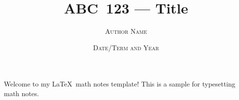 \documentclass[twoside]{article}
\begin{document}
\title{\Huge \bfseries ABC~123 --- Title}
\author{\large \scshape Author Name}
\date{\Large \scshape Date/Term and Year}
\maketitle

Welcome to my \LaTeX\ math notes template! This is a sample for typesetting math notes.

\pagestyle{plain}
\begin{spacing}{1.25}
    \tableofcontents
    \newpage
\end{spacing}
\thispagestyle{plain}

\pagestyle{fancy}



\end{document}
